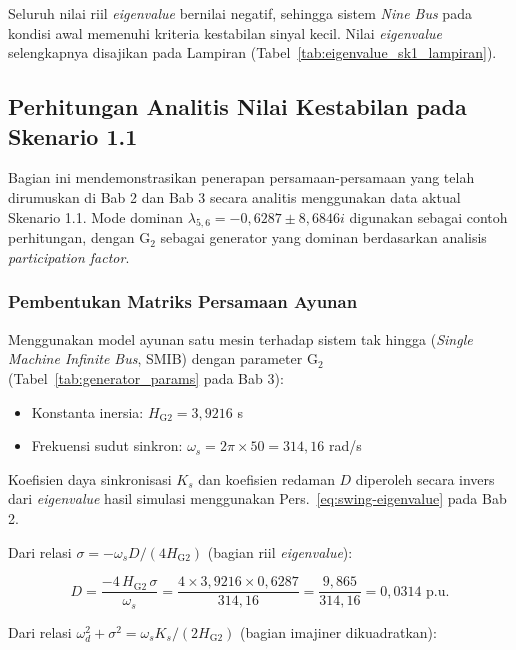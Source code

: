 Seluruh nilai riil \textit{eigenvalue} bernilai negatif, sehingga sistem
\textit{Nine Bus} pada kondisi awal memenuhi kriteria kestabilan sinyal kecil.
Nilai \textit{eigenvalue} selengkapnya disajikan pada Lampiran (Tabel~\ref{tab:eigenvalue_sk1_lampiran}).

\subsection{Perhitungan Analitis Nilai Kestabilan pada Skenario 1.1}

Bagian ini mendemonstrasikan penerapan persamaan-persamaan yang telah dirumuskan
di Bab 2 dan Bab 3 secara analitis menggunakan data aktual Skenario 1.1.
Mode dominan $\lambda_{5,6} = -0{,}6287 \pm 8{,}6846i$ digunakan sebagai contoh
perhitungan, dengan G$_2$ sebagai generator yang dominan berdasarkan analisis
\textit{participation factor}.

\subsubsection{Pembentukan Matriks Persamaan Ayunan}

Menggunakan model ayunan satu mesin terhadap sistem tak hingga
(\textit{Single Machine Infinite Bus}, SMIB) dengan parameter G$_2$
(Tabel~\ref{tab:generator_params} pada Bab 3):

\begin{itemize}
    \item Konstanta inersia: $H_{\text{G2}} = 3{,}9216$ s
    \item Frekuensi sudut sinkron: $\omega_s = 2\pi \times 50 = 314{,}16$ rad/s
\end{itemize}

Koefisien daya sinkronisasi $K_s$ dan koefisien redaman $D$ diperoleh secara
invers dari \textit{eigenvalue} hasil simulasi menggunakan
Pers.~\ref{eq:swing-eigenvalue} pada Bab 2.

Dari relasi $\sigma = -\omega_s D / (4H_{\text{G2}})$ (bagian riil
\textit{eigenvalue}):

\begin{equation}
    D = \frac{-4\,H_{\text{G2}}\,\sigma}{\omega_s}
      = \frac{4 \times 3{,}9216 \times 0{,}6287}{314{,}16}
      = \frac{9{,}865}{314{,}16}
      = 0{,}0314 \text{ p.u.}
    \label{eq:D_calc}
\end{equation}

Dari relasi $\omega_d^2 + \sigma^2 = \omega_s K_s / (2H_{\text{G2}})$
(bagian imajiner dikuadratkan):

